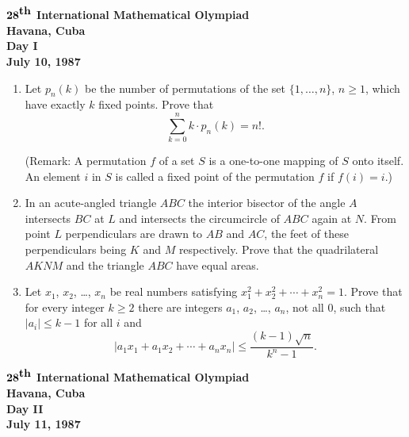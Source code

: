 \documentclass[12pt]{article}
\begin{document}
\begin{center}
${\bf 28}^{\mbox{\bf th}}$ {\bf International
Mathematical Olympiad} \\[.1in]
{\bf Havana, Cuba} \\ [.05in]
{\bf Day I}\\[.05in]
{\bf July 10, 1987}
\end{center}

\vspace*{.3in}

\begin{enumerate}
\item
Let $p_n(k)$ be the number of permutations of the set $\{1, \ldots, n\}$, $n
\geq 1$, which have exactly $k$ fixed points.  Prove that
$$\sum_{k=0}^n k \cdot p_n(k) = n!.$$

(Remark: A permutation $f$ of a set $S$ is a one-to-one mapping of $S$ onto
itself.  An element $i$ in $S$ is called a fixed point of the permutation $f$
if $f(i) = i$.)

\item
In an acute-angled triangle $ABC$ the interior bisector of the angle $A$
intersects $BC$ at $L$ and intersects the circumcircle of $ABC$ again at $N$.
From point $L$ perpendiculars are drawn to $AB$ and $AC$, the feet of these
perpendiculars being $K$ and $M$ respectively.  Prove that the quadrilateral
$AKNM$ and the triangle $ABC$ have equal areas.

\item
Let $x_1$, $x_2$, \ldots, $x_n$ be real numbers satisfying $x_1^2 + x_2^2 +
\cdots + x_n^2 = 1$.  Prove that for every integer $k \geq 2$ there are
integers $a_1$, $a_2$, \ldots, $a_n$, not all 0, such that $|a_i| \leq k - 1$
for all $i$ and
$$|a_1 x_1 + a_1 x_2 + \cdots + a_n x_n| \leq \frac{(k - 1) \sqrt{n}}{k^n -
1}.$$
\end{enumerate}

\pagebreak %
\begin{center}
${\bf 28}^{\mbox{\bf th}}$ {\bf International
Mathematical Olympiad} \\[.1in]
{\bf Havana, Cuba} \\ [.05in]
{\bf Day II}\\[.05in]
{\bf July 11, 1987}
\end{center}

\vspace*{.3in}
\end{document}
